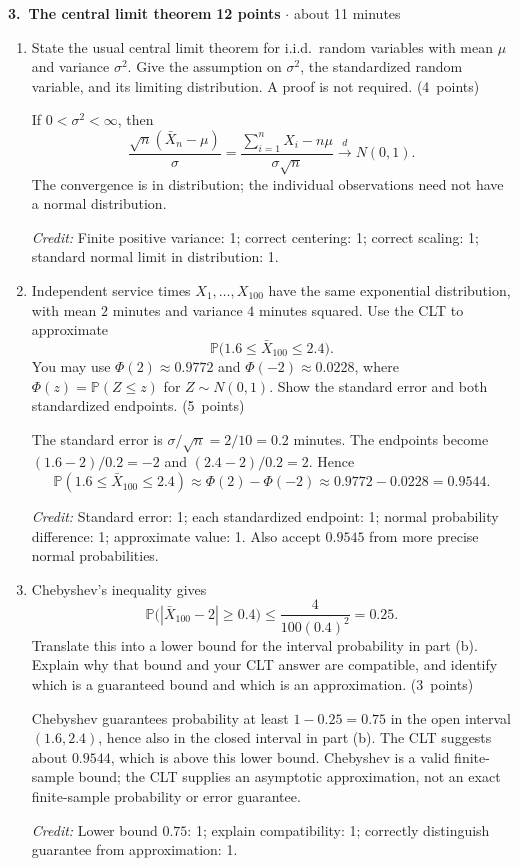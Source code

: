 \documentclass[11pt,letterpaper]{article}
\newcommand{\Prob}{\mathbb P}
\newcommand{\partpts}[1]{\unskip\nobreak\hspace{.3em}%
  \mbox{\small\color{muted}(#1 points)}}
\newcommand{\credit}[1]{\par{\footnotesize\color{muted}\textit{Credit:} #1}}
\newcommand{\problem}[4]{\par\addvspace{8pt}%
  {\large\bfseries\color{indigo}#1.\ #2}\hfill
  {\small\color{muted}\textbf{#3 points} $\cdot$ about #4 minutes}\par\nobreak}
\begin{document}
\newpage
\problem{3}{The central limit theorem}{12}{11}
\begin{enumerate}
  \item State the usual central limit theorem for i.i.d.\ random
  variables with mean $\mu$ and variance $\sigma^2$.
  Give the assumption on $\sigma^2$, the standardized random variable,
  and its limiting distribution. A proof is not required. \partpts{4}
  \begin{solution}[1.6in]
    If $0<\sigma^2<\infty$, then
    \[
      \frac{\sqrt n(\bar X_n-\mu)}{\sigma}
      =\frac{\sum_{i=1}^n X_i-n\mu}{\sigma\sqrt n}
      \xrightarrow{d}N(0,1).
    \]
    The convergence is in distribution; the individual observations
    need not have a normal distribution.
    \credit{Finite positive variance: 1; correct centering: 1;
    correct scaling: 1; standard normal limit in distribution: 1.}
  \end{solution}

  \item Independent service times $X_1,\ldots,X_{100}$ have the same
  exponential distribution, with mean $2$ minutes and variance $4$
  minutes squared. Use the CLT to approximate
  \[
    \Prob\bigl(1.6\le\bar X_{100}\le2.4\bigr).
  \]
  You may use $\Phi(2)\approx0.9772$ and $\Phi(-2)\approx0.0228$, where
  $\Phi(z)=\Prob(Z\le z)$ for $Z\sim N(0,1)$.
  Show the standard error and both standardized endpoints. \partpts{5}
  \begin{solution}[1.7in]
    The standard error is $\sigma/\sqrt n=2/10=0.2$ minutes.
    The endpoints become $(1.6-2)/0.2=-2$ and $(2.4-2)/0.2=2$.
    Hence
    \[
      \Prob(1.6\le\bar X_{100}\le2.4)
      \approx\Phi(2)-\Phi(-2)\approx0.9772-0.0228=0.9544.
    \]
    \credit{Standard error: 1; each standardized endpoint: 1;
    normal probability difference: 1; approximate value: 1.
    Also accept $0.9545$ from more precise normal probabilities.}
  \end{solution}

  \item Chebyshev's inequality gives
  \[
    \Prob\bigl(|\bar X_{100}-2|\ge0.4\bigr)
        \le\frac{4}{100(0.4)^2}=0.25.
  \]
  Translate this into a lower bound for the interval probability in
  part (b). Explain why that bound and your CLT answer are compatible,
  and identify which is a guaranteed bound and which is an approximation.
  \partpts{3}
  \begin{solution}[1.4in]
    Chebyshev guarantees probability at least $1-0.25=0.75$ in the
    open interval $(1.6,2.4)$, hence also in the closed interval in
    part (b). The CLT suggests about $0.9544$, which is above this lower
    bound. Chebyshev is a valid finite-sample bound; the CLT supplies
    an asymptotic approximation, not an exact finite-sample probability
    or error guarantee.
    \credit{Lower bound $0.75$: 1; explain compatibility: 1;
    correctly distinguish guarantee from approximation: 1.}
  \end{solution}
\end{enumerate}
\end{document}
